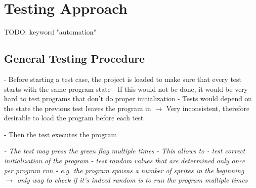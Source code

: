 
\chapter{Testing Approach}

TODO: keyword "automation"

\section{General Testing Procedure}

- Before starting a test case, the project is loaded to make sure that every test starts with the same program state
    - If this would not be done, it would be very hard to test programs that don't do proper initialization
    - Tests would depend on the state the previous test leaves the program in
    $\rightarrow$ Very inconsistent, therefore desirable to load the program before each test

- Then the test executes the program

\textit{- The test may press the green flag multiple times
- This allows to
    - test correct initialization of the program
    - test random values that are determined only once per program run
        - e.g. the program spawns a number of sprites in the beginning
        $\rightarrow$ only way to check if it's indeed random is to run the program multiple times
    }

